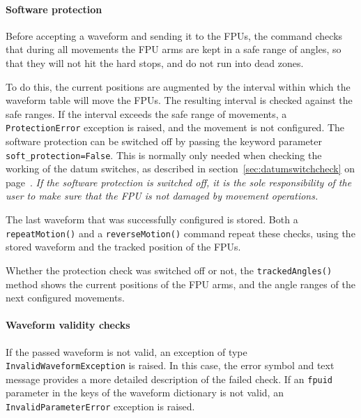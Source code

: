 \documentclass[fontsize=12,a4paper]{scrreprt}
\begin{document}
\paragraph{Software protection}
 Before accepting a waveform and sending it
to the FPUs, the command checks that during all movements the FPU arms
are kept in a safe range of angles, so that they will not hit the hard
stops, and do not run into dead zones.

To do this, the current positions are augmented by the interval within
which the waveform table will move the FPUs. The resulting interval is
checked against the safe ranges. If the interval exceeds the safe
range of movements, a \texttt{ProtectionError} exception is raised,
and the movement is not configured.  The software protection can be
switched off by passing the keyword parameter
\texttt{soft\_protection=False}. This is normally only needed when
checking the working of the datum switches, as described in
section~\ref{sec:datumswitchcheck} on
page~\pageref{sec:datumswitchcheck}. \emph{If the software protection
  is switched off, it is the sole responsibility of the user to make
  sure that the FPU is not damaged by movement operations.}

The last waveform that was successfully configured is stored. Both a
\texttt{repeatMotion()} and a \texttt{reverseMotion()} command repeat
these checks, using the stored waveform and the tracked position of
the FPUs.


Whether the protection check was switched off or not, the
\texttt{trackedAngles()} method shows the current positions of the FPU
arms, and the angle ranges of the next configured movements.




\paragraph{Waveform validity checks}
\begin{sloppypar}
If the passed waveform is not valid, an exception of type
\texttt{InvalidWaveformException} is raised. In this case, the error
symbol and text message provides a more detailed description of the
failed check. If an \texttt{fpuid} parameter in the keys of the waveform dictionary
is not valid, an \texttt{InvalidParameterError} exception is raised.
\end{sloppypar}
\end{document}
